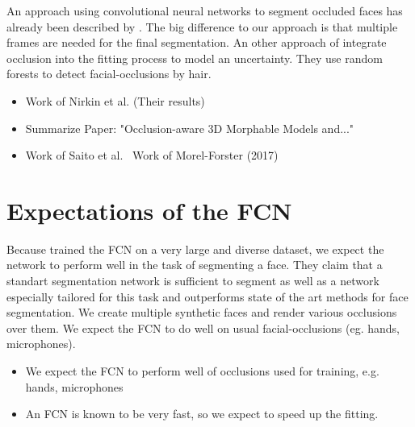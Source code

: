 An approach using convolutional neural networks to segment occluded faces has already been described by \cite{SaitoEtAl}. The big difference to our approach is that multiple frames are needed for the final segmentation. An other approach of \cite{MorelForster} integrate occlusion into the fitting process to model an uncertainty. They use random forests to detect facial-occlusions by hair.

\begin{itemize}
	\item Work of Nirkin et al. (Their results)
	\item Summarize Paper: "Occlusion-aware 3D Morphable Models and..."
	\item Work of Saito et al.
	\ Work of Morel-Forster (2017)
\end{itemize}

\section{Expectations of the FCN}
Because \cite{nirkin2018_faceswap} trained the FCN on a very large and diverse dataset, we expect the network to perform well in the task of segmenting a face. They claim that a standart segmentation network is sufficient to segment as well as a network especially tailored for this task and outperforms state of the art methods for face segmentation. We create multiple synthetic faces and render various occlusions over them. We expect the FCN to do well on usual facial-occlusions (eg. hands, microphones).

	\begin{itemize}
		\item We expect the FCN to perform well of occlusions used for training, e.g. hands, microphones
		\item An FCN is known to be very fast, so we expect to speed up the fitting.
	\end{itemize}





